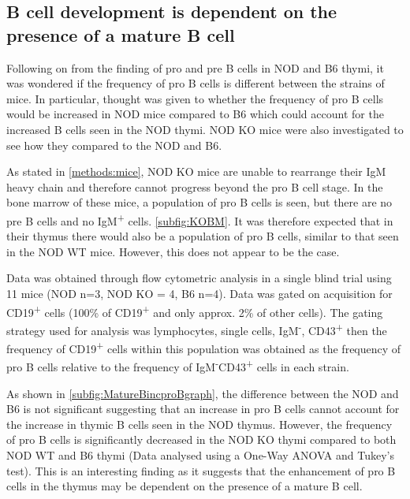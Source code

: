 \subsection{B cell development is dependent on the presence of a mature B cell}

Following on from the finding of pro and pre B cells in NOD and B6 thymi, it was wondered if the frequency of pro B cells is different between the strains of mice.
In particular, thought was given to whether the frequency of pro B cells would be increased in NOD mice compared to B6 which could account for the increased B cells seen in the NOD thymi.
NOD KO mice were also investigated to see how they compared to the NOD and B6.  


As stated in \cref{methods:mice}, NOD KO mice are unable to rearrange their IgM heavy chain and therefore cannot progress beyond the pro B cell stage. 
In the bone marrow of these mice, a population of pro B cells is seen, but there are no pre B cells and no IgM\textsuperscript{+} cells. \cref{subfig:KOBM}.
It was therefore expected that in their thymus there would also be a population of pro B cells, similar to that seen in the NOD WT mice. 
However, this does not appear to be the case.


Data was obtained through flow cytometric analysis in a single blind trial using 11 mice (NOD n=3, NOD KO = 4, B6 n=4). 
Data was gated on acquisition for CD19\textsuperscript{+} cells (100\% of CD19\textsuperscript{+} and only approx. 2\% of other cells).
The gating strategy used for analysis was lymphocytes, single cells, IgM\textsuperscript{-}, CD43\textsuperscript{+} then the frequency of CD19\textsuperscript{+} cells within this population was obtained as the frequency of pro B cells relative to the frequency of IgM\textsuperscript{-}CD43\textsuperscript{+} cells in each strain.

As shown in \cref{subfig:MatureBincproBgraph}, the difference between the NOD and B6 is not significant suggesting that an increase in pro B cells cannot account for the increase in thymic B cells seen in the NOD thymus.
However, the frequency of pro B cells is significantly decreased in the NOD KO thymi compared to both NOD WT and B6 thymi (Data analysed using a One-Way ANOVA and Tukey's test). 
This is an interesting finding as it suggests that the enhancement of pro B cells in the thymus may be dependent on the presence of a mature B cell.


